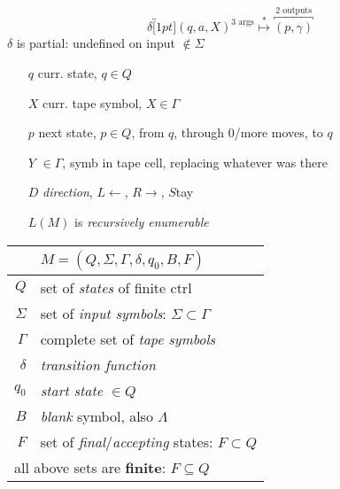 {\footnotesize
\begin{minipage}[]{0.5\linewidth}
\setlength{\abovedisplayskip}{0pt}
\setlength{\belowdisplayskip}{0pt}
  \[\delta\overbracket[1pt]{(q,a,X)}^\text{3 args} \overset{*}{\mapsto} \overbracket{(p,\gamma)}^\text{2 outputs} \]
  $\delta$ is partial: undefined on input \(\notin \Sigma\)
\begin{enumerate}[leftmargin=*,labelindent=0pt]
    \item[$q$] curr. state, \(q \in Q\)
    \item[$X$] curr. tape symbol, \(X \in \Gamma\)
    \item[$p$] next state, \(p \in Q\), from \(q\), through 0/more moves, to \(q\)
    \item[$Y$] \(\in \Gamma\), symb in tape cell, replacing whatever was there
    \item[$D$] \emph{direction}, \(L\leftarrow\), \(R\rightarrow\), \(S\)tay
    \item[]\(L(M)\) is \emph{recursively enumerable}
    \end{enumerate}

\end{minipage}
\begin{minipage}{0.5\linewidth}
  \centering
  \begin{tabular}{r|p{3.8cm}}
    & $ M = (Q,\Sigma,\Gamma,\delta,q_{0},B,F)$  \\
    \hline
    $Q$ & set of \emph{states} of finite ctrl\\
    $\Sigma$ & set of \emph{input symbols}: \(\Sigma \subset \Gamma\)\\
    $\Gamma$ & complete set of \emph{tape symbols}\\
    $\delta$ & \emph{transition function}\\
    $q_{0}$  &  \emph{start state} \(\in Q\)\\
    $B$     & \emph{blank} symbol, also \(\Lambda\)\\
    $F$      & set of \emph{final}/\emph{accepting} states: \(F \subset Q\)\\
    \hline
    \multicolumn{2}{l}{all above sets are \textbf{finite}: \(F \subseteq Q\) }\\
    \hline
\end{tabular}\\
\end{minipage}
 }
